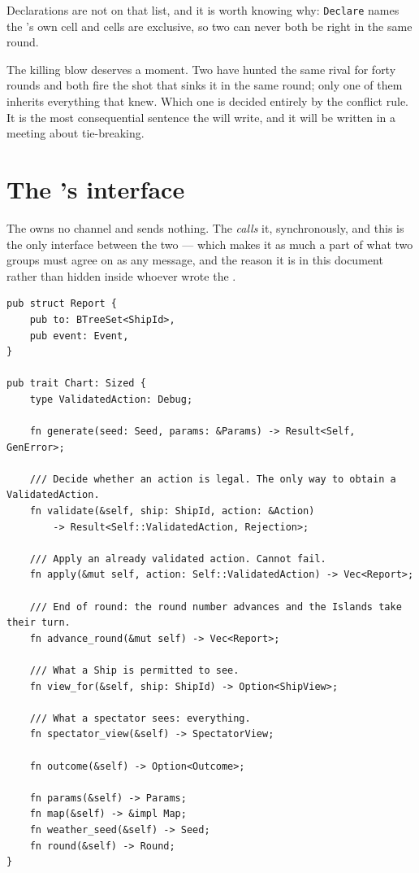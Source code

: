 \documentclass{article}
\begin{document}
Declarations are not on that list, and it is worth knowing why: \texttt{Declare} names the \ship's
own cell and cells are exclusive, so two \ships can never both be right in the same round.

The killing blow deserves a moment. Two \ships have hunted the same rival for forty rounds and both
fire the shot that sinks it in the same round; only one of them inherits everything that \ship{}
knew. Which one is decided entirely by the conflict rule. It is the most consequential sentence the
\WG{} will write, and it will be written in a meeting about tie-breaking.

\newpage
\section{The \chart's interface}
\label{proto:chartapi}

The \chart{} owns no channel and sends nothing. The \admiralty{} \emph{calls} it, synchronously,
and this is the only interface between the two --- which makes it as much a part of what two
groups must agree on as any message, and the reason it is in this document rather than hidden
inside whoever wrote the \chart.

\begin{lstlisting}
pub struct Report {
    pub to: BTreeSet<ShipId>,
    pub event: Event,
}

pub trait Chart: Sized {
    type ValidatedAction: Debug;

    fn generate(seed: Seed, params: &Params) -> Result<Self, GenError>;

    /// Decide whether an action is legal. The only way to obtain a ValidatedAction.
    fn validate(&self, ship: ShipId, action: &Action)
        -> Result<Self::ValidatedAction, Rejection>;

    /// Apply an already validated action. Cannot fail.
    fn apply(&mut self, action: Self::ValidatedAction) -> Vec<Report>;

    /// End of round: the round number advances and the Islands take their turn.
    fn advance_round(&mut self) -> Vec<Report>;

    /// What a Ship is permitted to see.
    fn view_for(&self, ship: ShipId) -> Option<ShipView>;

    /// What a spectator sees: everything.
    fn spectator_view(&self) -> SpectatorView;

    fn outcome(&self) -> Option<Outcome>;

    fn params(&self) -> Params;
    fn map(&self) -> &impl Map;
    fn weather_seed(&self) -> Seed;
    fn round(&self) -> Round;
}
\end{lstlisting}
\end{document}
